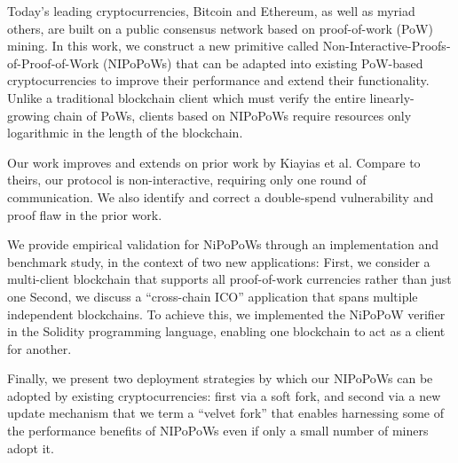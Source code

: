 Today's leading cryptocurrencies, Bitcoin and Ethereum, as well as myriad others, are built on a public consensus network based on proof-of-work (PoW) mining. In this work, we construct a new primitive called Non-Interactive-Proofs-of-Proof-of-Work (NIPoPoWs) that can be adapted into existing PoW-based cryptocurrencies to improve their performance and extend their functionality.
Unlike a traditional blockchain client
which must verify the entire linearly-growing chain of PoWs, clients based on
NIPoPoWs require resources only logarithmic in the length of the blockchain.

Our work improves and extends on prior work by Kiayias et al. Compare to theirs, our protocol is non-interactive, requiring only one round of communication. We also identify and correct a double-spend vulnerability and proof flaw in the prior work. %

We provide empirical validation for NiPoPoWs through an implementation and benchmark study, in the context of two new applications:
First, we consider a multi-client blockchain that supports all proof-of-work currencies rather than just one%
Second, we discuss a ``cross-chain ICO'' application that spans multiple independent blockchains. To achieve this, we implemented the NiPoPoW verifier in the Solidity programming language, enabling one blockchain to act as a client for another.

Finally, we present two deployment strategies by which our NIPoPoWs can be adopted by existing cryptocurrencies: first via a soft fork, and second via a new update mechanism that we
term a ``velvet fork'' that enables harnessing some of the performance benefits
of NIPoPoWs even if only a small number of miners adopt it.
